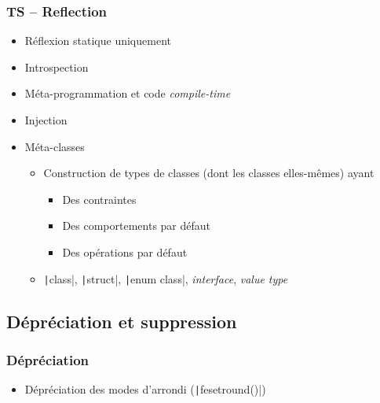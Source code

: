 \documentclass[C++.tex]{subfiles}
\begin{document}
\begin{frame}[fragile]
	\frametitle{TS -- Reflection}
	\begin{itemize}
		\item Réflexion statique uniquement
		\item Introspection
		\item Méta-programmation et code \textit{compile-time}
		\item Injection
		\item Méta-classes
		\begin{itemize}
			\item Construction de types de classes (dont les classes elles-mêmes) ayant
			\begin{itemize}
				\item Des contraintes
				\item Des comportements par défaut
				\item Des opérations par défaut
			\end{itemize}
			\item \texttt|class|, \texttt|struct|, \texttt|enum class|, \textit{interface}, \textit{value type}
		\end{itemize}
	\end{itemize}
\end{frame}

\subsection*{Dépréciation et suppression}
\begin{frame}[fragile]
	\frametitle{Dépréciation}
	\begin{itemize}
		\item Dépréciation des modes d'arrondi (\texttt|fesetround()|)
	\end{itemize}
\end{frame}
\end{document}
